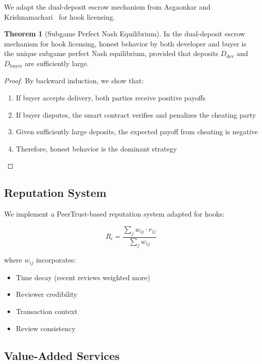 \documentclass[11pt,a4paper]{article}
\theoremstyle{definition}
\newtheorem{theorem}{Theorem}[section]
\theoremstyle{remark}
\newcommand{\developer}{\text{dev}}
\newcommand{\buyer}{\text{buyer}}
\begin{document}
We adapt the dual-deposit escrow mechanism from Asgaonkar and Krishnamachari~\cite{asgaonkar2018} for hook licensing.

\begin{theorem}[Subgame Perfect Nash Equilibrium]
In the dual-deposit escrow mechanism for hook licensing, honest behavior by both developer and buyer is the unique subgame perfect Nash equilibrium, provided that deposits $D_{\developer}$ and $D_{\buyer}$ are sufficiently large.
\end{theorem}

\begin{proof}
By backward induction, we show that:
\begin{enumerate}
    \item If buyer accepts delivery, both parties receive positive payoffs
    \item If buyer disputes, the smart contract verifies and penalizes the cheating party
    \item Given sufficiently large deposits, the expected payoff from cheating is negative
    \item Therefore, honest behavior is the dominant strategy
\end{enumerate}
\end{proof}

\subsection{Reputation System}

We implement a PeerTrust-based reputation system adapted for hooks:

\begin{equation}
R_i = \frac{\sum_{j} w_{ij} \cdot r_{ij}}{\sum_{j} w_{ij}}
\end{equation}

where $w_{ij}$ incorporates:
\begin{itemize}
    \item Time decay (recent reviews weighted more)
    \item Reviewer credibility
    \item Transaction context
    \item Review consistency
\end{itemize}

\subsection{Value-Added Services}
\end{document}
